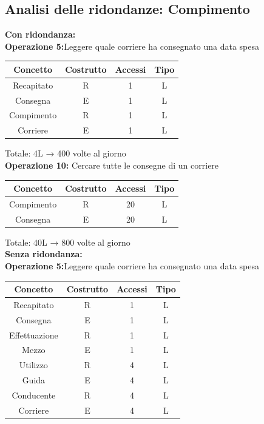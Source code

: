 \documentclass[a4paper,12pt]{report}
\begin{document}
\subsection{Analisi delle ridondanze: Compimento}
\textbf{Con ridondanza:}\\
\textbf{Operazione 5:}Leggere quale corriere ha consegnato una data spesa\\
\begin{center}
    \begin{tabular}{ | c   c   c   c | } 
    \hline
	Concetto&Costrutto&Accessi&Tipo\\
	\hline
	Recapitato&R&1&L\\
	\hline
    Consegna&E&1&L\\
	\hline
	Compimento&R&1&L\\
	\hline
	Corriere&E&1&L\\
	\hline
	\end{tabular}
\end{center}
Totale: 4L → 400 volte al giorno\\
\textbf{Operazione 10:}
Cercare tutte le consegne di un corriere\\
\begin{center}
    \begin{tabular}{ | c   c   c   c | } 
    \hline
	Concetto&Costrutto&Accessi&Tipo\\
	\hline
	Compimento&R&20&L\\
	\hline
    Consegna&E&20&L\\
	\hline
	\end{tabular}
\end{center}
Totale: 40L → 800 volte al giorno\\
\textbf{Senza ridondanza:}\\
\textbf{Operazione 5:}Leggere quale corriere ha consegnato una data spesa\\
\begin{center}
    \begin{tabular}{ | c   c   c   c | } 
    \hline
	Concetto&Costrutto&Accessi&Tipo\\
	\hline
	Recapitato&R&1&L\\
	\hline
    Consegna&E&1&L\\
	\hline
	Effettuazione&R&1&L\\
	\hline
	Mezzo&E&1&L\\
	\hline
	Utilizzo&R&4&L\\
	\hline
	Guida&E&4&L\\
	\hline
	Conducente&R&4&L\\
	\hline
	Corriere&E&4&L\\
	\hline
	\end{tabular}
\end{center}
\end{document}

